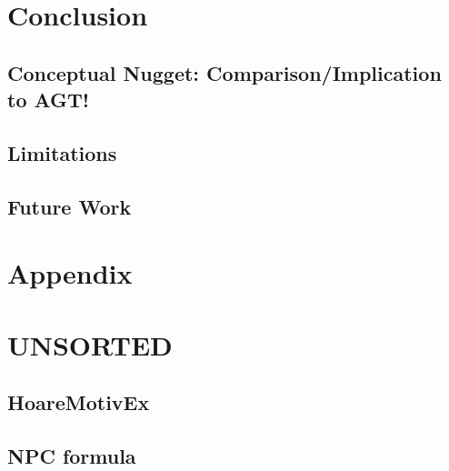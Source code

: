 \chapter{Conclusion}
\label{ch:conclusion}


\section{Conceptual Nugget: Comparison/Implication to AGT!}

\section{Limitations}
\label{sec:limitations}


\section{Future Work}
\label{sec:future-work}


\chapter{Appendix}


\chapter{UNSORTED}

\section{HoareMotivEx}
\label{sec:hoaremotivex}


\section{NPC formula}
\label{sec:npc-formula}
